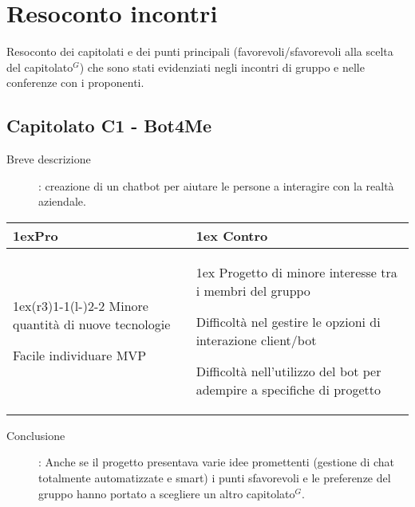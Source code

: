 \section{Resoconto incontri}
Resoconto dei capitolati e dei punti principali (favorevoli/sfavorevoli alla scelta del capitolato$^{G}$) che sono stati evidenziati negli incontri di gruppo e nelle conferenze con i proponenti.

\subsection{Capitolato C1 - Bot4Me}
\begin{description}
	\item [Breve descrizione]: creazione di un chatbot per aiutare le persone a interagire con la realtà aziendale.
\end{description}
\begin{table}[h]
\begin{tabularx}{\linewidth}{>{\parskip1ex}X@{\kern4\tabcolsep}>{\parskip1ex}X}
\hfil\bfseries Pro
&
\hfil\bfseries Contro
\\\cmidrule(r{3\tabcolsep}){1-1}\cmidrule(l{-\tabcolsep}){2-2}
Minore quantità di nuove tecnologie \par
Facile individuare MVP
&
Progetto di minore interesse tra i membri del gruppo \par
Difficoltà nel gestire le opzioni di interazione client/bot \par
Difficoltà nell'utilizzo del bot per adempire a specifiche di progetto
\end{tabularx}
\end{table}
\begin{description}
	\item [Conclusione]: Anche se il progetto presentava varie idee promettenti (gestione di chat totalmente automatizzate e smart) i punti sfavorevoli e le preferenze del gruppo hanno portato a scegliere un altro capitolato$^{G}$.
\end{description}

\vspace{1cm}

